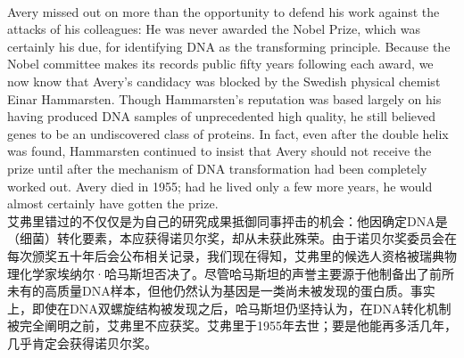 \documentclass{article}
\begin{document}
\\
Avery missed out on more than the opportunity to defend his work against the attacks of his colleagues: He was never awarded the Nobel Prize, which was certainly his due, for identifying DNA as the transforming principle. Because the Nobel committee makes its records public fifty years following each award, we now know that Avery’s candidacy was blocked by the Swedish physical chemist Einar Hammarsten. Though Hammarsten’s reputation was based largely on his having produced DNA samples of unprecedented high quality, he still believed genes to be an undiscovered class of proteins. In fact, even after the double helix was found, Hammarsten continued to insist that Avery should not receive the prize until after the mechanism of DNA transformation had been completely worked out. Avery died in 1955; had he lived only a few more years, he would almost certainly have gotten the prize.\\
艾弗里错过的不仅仅是为自己的研究成果抵御同事抨击的机会：他因确定DNA是（细菌）转化要素，本应获得诺贝尔奖，却从未获此殊荣。由于诺贝尔奖委员会在每次颁奖五十年后会公布相关记录，我们现在得知，艾弗里的候选人资格被瑞典物理化学家埃纳尔·哈马斯坦否决了。尽管哈马斯坦的声誉主要源于他制备出了前所未有的高质量DNA样本，但他仍然认为基因是一类尚未被发现的蛋白质。事实上，即使在DNA双螺旋结构被发现之后，哈马斯坦仍坚持认为，在DNA转化机制被完全阐明之前，艾弗里不应获奖。艾弗里于1955年去世；要是他能再多活几年，几乎肯定会获得诺贝尔奖。\\
\end{document}
